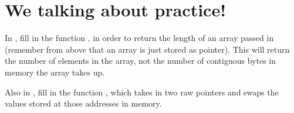 \documentclass{tufte-handout}
\begin{document}
\section{We talking about practice!}


In , fill in the function , in order to return the length of an array passed in (remember from above that an array is just stored as pointer).
This will return the number of elements in the array, not the number of contiguous bytes in memory the array takes up.

Also in , fill in the function , which takes in two raw pointers and swaps the values stored at those addresses in memory.
\end{document}
